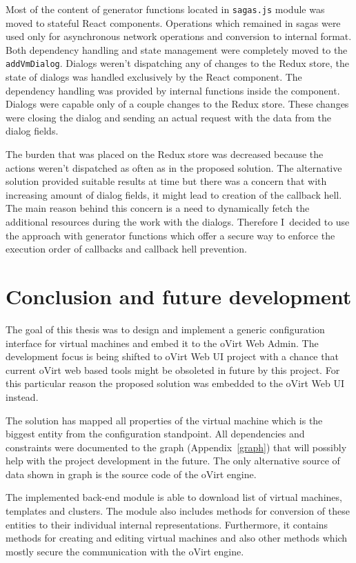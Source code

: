 Most of the content of generator functions located in \texttt{sagas.js} module was moved to stateful React components. Operations which remained in sagas were used only for asynchronous network operations and conversion to internal format. Both dependency handling and state management were completely moved to the \texttt{addVmDialog}. Dialogs weren't dispatching any of changes to the Redux store, the state of dialogs was handled exclusively by the React component. The dependency handling was provided by internal functions inside the component. Dialogs were capable only of a couple changes to the Redux store. These changes were closing the dialog and sending an actual request with the data from the dialog fields.

The burden that was placed on the Redux store was decreased because the actions weren't dispatched as often as in the proposed solution. The alternative solution provided suitable results at time but there was a concern that with increasing amount of dialog fields, it might lead to creation of the callback hell. The main reason behind this concern is a need to dynamically fetch the additional resources during the work with the dialogs. Therefore I~decided to use the approach with generator functions which offer a secure way to enforce the execution order of callbacks and callback hell prevention.

\chapter{Conclusion and future development}
The goal of this thesis was to design and implement a generic configuration interface for virtual machines and embed it to the oVirt Web Admin. The development focus is being shifted to oVirt Web UI project with a chance that current oVirt web based tools might be obsoleted in future by this project. For this particular reason the proposed solution was embedded to the oVirt Web UI instead.

The solution has mapped all properties of the virtual machine which is the biggest entity from the configuration standpoint. All dependencies and constraints were documented to the graph (Appendix~\ref{graph}) that will possibly help with the project development in the future. The only alternative source of data shown in graph is the source code of the oVirt engine.

The implemented back-end module is able to download list of virtual machines, templates and clusters. The module also includes methods for conversion of these entities to their individual internal representations. Furthermore, it contains methods for creating and editing virtual machines and also other methods which mostly secure the communication with the oVirt engine.

